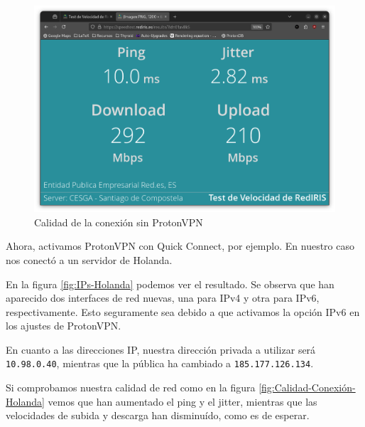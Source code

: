 \begin{figure}[H]
    \centering
    \includegraphics[width=\linewidth]{CalidadConexion.png}
    \caption{Calidad de la conexión sin ProtonVPN}
    \label{fig:Calidad-Conexión}
\end{figure}


Ahora, activamos ProtonVPN con Quick Connect, por ejemplo. En nuestro caso nos conectó a un servidor de Holanda.

En la figura \ref{fig:IPs-Holanda} podemos ver el resultado. Se observa que han aparecido dos interfaces de red nuevas, una para IPv4 y otra para IPv6, respectivamente. Esto seguramente sea debido a que activamos la opción IPv6 en los ajustes de ProtonVPN.

En cuanto a las direcciones IP, nuestra dirección privada a utilizar será \texttt{10.98.0.40}, mientras que la pública ha cambiado a \texttt{185.177.126.134}.

Si comprobamos nuestra calidad de red como en la figura \ref{fig:Calidad-Conexión-Holanda} vemos que han aumentado el ping y el jitter, mientras que las velocidades de subida y descarga han disminuído, como es de esperar.

